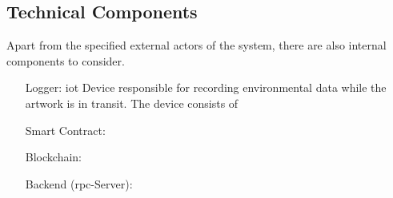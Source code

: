 \subsection{Technical Components}
Apart from the specified external actors of the system, there are also internal components to consider.

\begin{itemize}[align=left,font=\itshape]
    \item[Logger:] \gls{iot} Device responsible for recording environmental data while the artwork is in transit. The device consists of  
    \item[Smart Contract:]  
    \item[Blockchain:]
    \item[Backend (\gls{rpc}-Server):]
\end{itemize}

